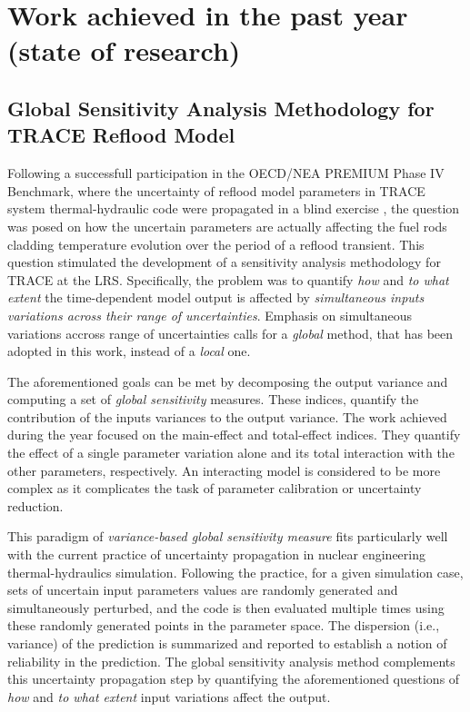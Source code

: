 \documentclass[11pt,titlepage]{article}
\begin{document}
\section{Work achieved in the past year (state of research)}

\subsection{Global Sensitivity Analysis Methodology for TRACE Reflood Model}

Following a successfull participation in the OECD/NEA PREMIUM Phase IV Benchmark, where the uncertainty of reflood model parameters in TRACE system thermal-hydraulic code were propagated in a blind exercise \cite{Wicaksono2014c}, the question was posed on how the uncertain parameters are actually affecting the fuel rods cladding temperature evolution over the period of a reflood transient.
This question stimulated the development of a sensitivity analysis methodology for TRACE at the LRS.
Specifically, the problem was to quantify \emph{how} and \emph{to what extent} the time-dependent model output is affected by \emph{simultaneous inputs variations across their range of uncertainties}.
Emphasis on simultaneous variations accross range of uncertainties calls for a \emph{global} method, that has been adopted in this work, instead of a \emph{local} one.

The aforementioned goals can be met by decomposing the output variance and computing a set of \emph{global sensitivity} measures. 
These indices, quantify the contribution of the inputs variances to the output variance.
The work achieved during the year focused on the main-effect and total-effect indices.
They quantify the effect of a single parameter variation alone and its total interaction with the other parameters, respectively.
An interacting model is considered to be more complex as it complicates the task of parameter calibration or uncertainty reduction.

This paradigm of \textit{variance-based global sensitivity measure} fits particularly well with the current practice of uncertainty propagation in nuclear engineering thermal-hydraulics simulation.
Following the practice, for a given simulation case, sets of uncertain input parameters values are randomly generated and simultaneously perturbed, and the code is then evaluated multiple times using
these randomly generated points in the parameter space.
The dispersion (i.e., variance) of the prediction is summarized and reported to establish a notion of reliability in the prediction.
The global sensitivity analysis method complements this uncertainty propagation step by quantifying the 
aforementioned questions of \emph{how} and \emph{to what extent} input variations affect the output.
\end{document}
